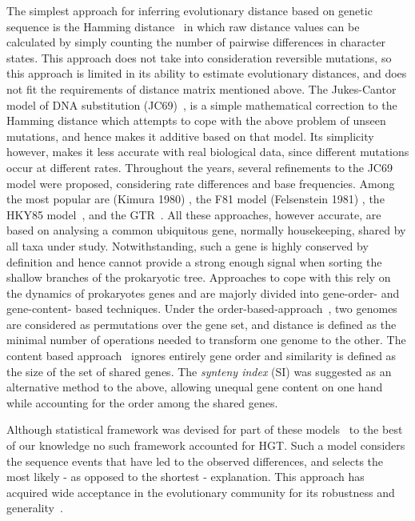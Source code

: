\documentclass[runningheads, 11pt]{llncs}
\begin{document}
The simplest approach for inferring evolutionary distance based on genetic
sequence is the Hamming distance~\cite{hamming1950error} in which raw distance
values can be calculated by simply counting the number of pairwise differences
in character states. This approach does not take into consideration reversible
mutations, so this approach is limited in its ability to estimate evolutionary
distances, and does not fit the requirements of distance matrix mentioned above.
The Jukes-Cantor model of DNA substitution (JC69)~\cite{jukes1969evolution}, is
a simple mathematical correction to the Hamming distance which attempts to
cope with the above problem of unseen mutations, and hence makes it additive
based on that model. Its simplicity however, makes it less accurate with real
biological data, since different mutations occur at different rates. Throughout
the years, several refinements to the JC69 model were proposed, considering rate
differences and base frequencies. Among the most popular are (Kimura 1980)
\cite{kimura1980simple}, the F81 model (Felsenstein 1981)
\cite{felsenstein1981evolutionary}, the HKY85 model~\cite{hasegawa1985dating},
and the GTR~\cite{tavare1986some}. All these approaches, however accurate, are
based on analysing a common ubiquitous gene, normally housekeeping, shared by
all taxa under study. Notwithstanding, such a gene is highly conserved by
definition and hence cannot provide a strong enough signal when sorting the
shallow branches of the prokaryotic tree. Approaches to cope with this rely on
the dynamics of prokaryotes genes and are majorly divided into gene-order- and
gene-content- based techniques. Under the
order-based-approach~\cite{GRAPPA1,GRIMM,Sankoff-2002}, two genomes are
considered as permutations over the gene set, and distance is defined as the
minimal number of operations needed to transform one genome to the other. The
content based
approach~\cite{Snel-NatGen-1999,Tekaia-JME-99,Fitz-Gibbon-NAR-1999} ignores
entirely gene order and similarity is defined as the size of the set of shared
genes. The {\em synteny index} (SI)\cite{Shifman13,Adato-PLOSCB-2015} was
suggested as an alternative method to the above, allowing unequal gene content
on one hand while accounting for the order among the shared genes.

Although statistical framework was devised for part of these
models~\cite{Serdoz-JTB-2017,wang-STOC-2001,Biller-RECOMB-CG-2015,SANKOFF-DAM-1996}
to the best of our knowledge no such framework accounted for HGT. Such a model
considers the sequence events that have led to the observed differences, and
selects the most likely - as opposed to the shortest - explanation. This
approach has acquired wide acceptance in the evolutionary community for its
robustness and
generality~\cite{HPold,HP,HPS,FELSENSTEIN78,felsenstein1981evolutionary}.
\end{document}
